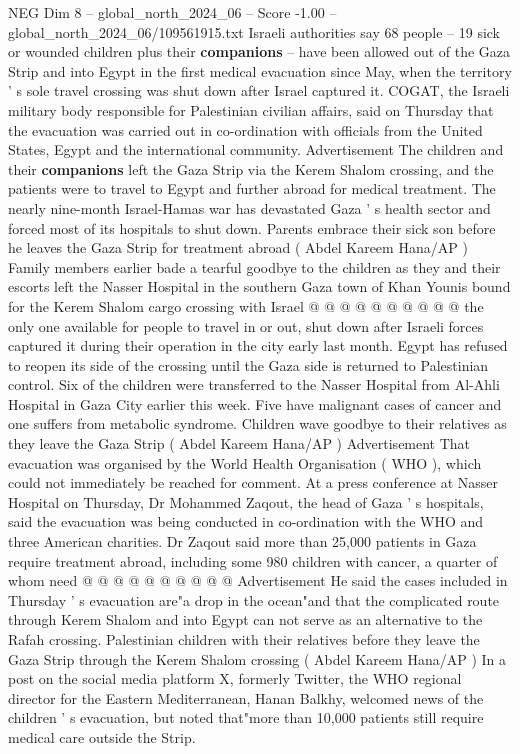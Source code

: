 \begin{textsample}{NEG Dim 8 – global\_north\_2024\_06 – Score -1.00 – global\_north\_2024\_06/109561915.txt}  \label{ex:f8_neg_389}
Israeli authorities say 68 people -- 19 sick or wounded children plus their \textbf{companions} -- have been allowed out of the Gaza Strip and into Egypt in the first medical evacuation since May, when the territory ' s sole travel crossing was shut down after Israel captured it.
COGAT, the Israeli military body responsible for Palestinian civilian affairs, said on Thursday that the evacuation was carried out in co-ordination with officials from the United States, Egypt and the international community.
Advertisement The children and their \textbf{companions} left the Gaza Strip via the Kerem Shalom crossing, and the patients were to travel to Egypt and further abroad for medical treatment.
The nearly nine-month Israel-Hamas war has devastated Gaza ' s health sector and forced most of its hospitals to shut down.
Parents embrace their sick son before he leaves the Gaza Strip for treatment abroad ( Abdel Kareem Hana/AP ) Family members earlier bade a tearful goodbye to the children as they and their escorts left the Nasser Hospital in the southern Gaza town of Khan Younis bound for the Kerem Shalom cargo crossing with Israel @ @ @ @ @ @ @ @ @ @ the only one available for people to travel in or out, shut down after Israeli forces captured it during their operation in the city early last month.
Egypt has refused to reopen its side of the crossing until the Gaza side is returned to Palestinian control.
Six of the children were transferred to the Nasser Hospital from Al-Ahli Hospital in Gaza City earlier this week.
Five have malignant cases of cancer and one suffers from metabolic syndrome.
Children wave goodbye to their relatives as they leave the Gaza Strip ( Abdel Kareem Hana/AP ) Advertisement That evacuation was organised by the World Health Organisation ( WHO ), which could not immediately be reached for comment.
At a press conference at Nasser Hospital on Thursday, Dr Mohammed Zaqout, the head of Gaza ' s hospitals, said the evacuation was being conducted in co-ordination with the WHO and three American charities.
Dr Zaqout said more than 25,000 patients in Gaza require treatment abroad, including some 980 children with cancer, a quarter of whom need @ @ @ @ @ @ @ @ @ @ Advertisement He said the cases included in Thursday ' s evacuation are"a drop in the ocean"and that the complicated route through Kerem Shalom and into Egypt can not serve as an alternative to the Rafah crossing.
Palestinian children with their relatives before they leave the Gaza Strip through the Kerem Shalom crossing ( Abdel Kareem Hana/AP ) In a post on the social media platform X, formerly Twitter, the WHO regional director for the Eastern Mediterranean, Hanan Balkhy, welcomed news of the children ' s evacuation, but noted that"more than 10,000 patients still require medical care outside the Strip.

\end{textsample}
